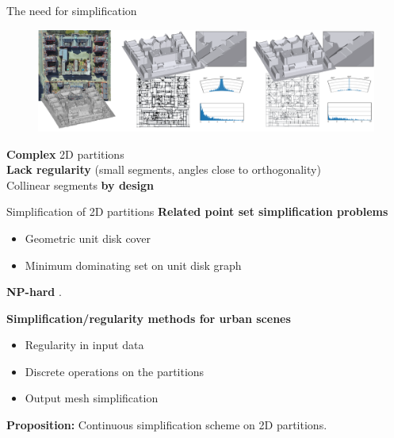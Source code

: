 \begin{frame}{The need for simplification}
	\begin{figure}
		\includegraphics[width=\linewidth]{teaser_v2}
	\end{figure}
	
	\textbf{Complex} 2D partitions\\
	\textbf{Lack regularity} (small segments, angles close to orthogonality)\\
	Collinear segments \textbf{by design}\\
		
\end{frame}

\begin{frame}{Simplification of 2D partitions}
	\scriptsize
	\textbf{Related point set simplification problems}
	\begin{itemize}
		\item Geometric unit disk cover
		\item Minimum dominating set on unit disk graph
	\end{itemize}
	\textbf{NP-hard} \cite{marathe_SimpleHeuristicsUnit_1995}.
	
	\textbf{Simplification/regularity methods for urban scenes}
	\begin{itemize}
		\item Regularity in input data \cite{zhou_5DDualContouring_2010, monszpart_RAPterRebuildingManmade_2015}
		\item Discrete operations on the partitions \cite{li_ApproximatingShapesImages_2020}
		\item Output mesh simplification \cite{garland_SurfaceSimplificationUsing_1997, salinas_StructureAwareMeshDecimation_2015}
	\end{itemize}

	\textbf{Proposition:} Continuous simplification scheme on 2D partitions.
\end{frame}


